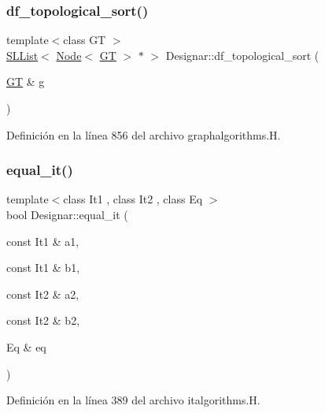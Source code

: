 \subsubsection{\texorpdfstring{df\+\_\+topological\+\_\+sort()}{df\_topological\_sort()}}
{\footnotesize\ttfamily template$<$class GT $>$ \\
\hyperlink{class_designar_1_1_s_l_list}{S\+L\+List}$<$ \hyperlink{namespace_designar_a5af326c65aa2bd26b26c410f2030d09e}{Node}$<$ \hyperlink{demo-buildgraph_8_c_a3001c40d2c31ca87ed96cd7d1334a55e}{GT} $>$ $\ast$ $>$ Designar\+::df\+\_\+topological\+\_\+sort (\begin{DoxyParamCaption}\item[{\hyperlink{demo-buildgraph_8_c_a3001c40d2c31ca87ed96cd7d1334a55e}{GT} \&}]{g }\end{DoxyParamCaption})}



Definición en la línea 856 del archivo graphalgorithms.\+H.

\mbox{\label{namespace_designar_a72be3d25570a225bb5e468e62dd73984}} 
\subsubsection{\texorpdfstring{equal\+\_\+it()}{equal\_it()}\hspace{0.1cm}{\footnotesize\ttfamily [1/2]}}
{\footnotesize\ttfamily template$<$class It1 , class It2 , class Eq $>$ \\
bool Designar\+::equal\+\_\+it (\begin{DoxyParamCaption}\item[{const It1 \&}]{a1,  }\item[{const It1 \&}]{b1,  }\item[{const It2 \&}]{a2,  }\item[{const It2 \&}]{b2,  }\item[{Eq \&}]{eq }\end{DoxyParamCaption})}



Definición en la línea 389 del archivo italgorithms.\+H.

\mbox{\label{namespace_designar_a022cf72b1e28929770af36d322a89c9d}} 
